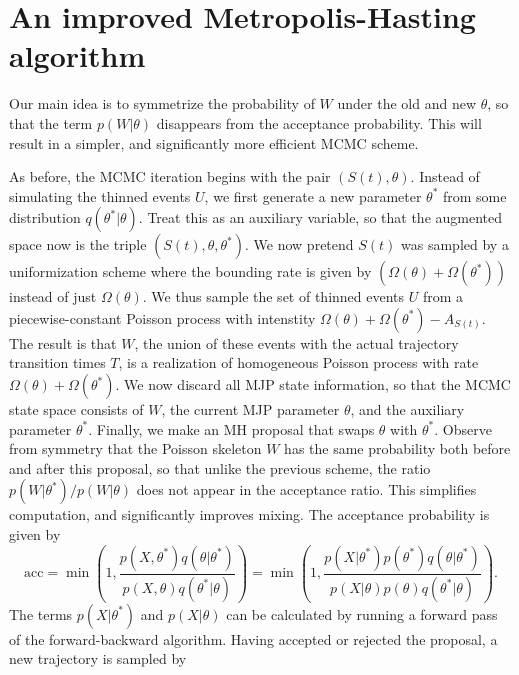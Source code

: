 
\section{An improved Metropolis-Hasting algorithm}

Our main idea is to symmetrize the probability of $W$ under the old and new 
$\theta$, so that the term
$p(W|\theta)$ disappears from the acceptance probability. This will result
in a simpler, and significantly more efficient MCMC scheme.

As before, the MCMC iteration begins with the pair $(S(t), \theta)$. 
Instead of simulating the thinned events $U$, we first generate a new parameter 
$\theta^*$ from some distribution $q(\theta^*|\theta)$. Treat this as an 
auxiliary variable, so that the augmented space now is the triple 
$(S(t), \theta,\theta^*)$. We now pretend $S(t)$ was sampled by a 
uniformization scheme where the bounding rate is given by 
$(\Omega(\theta) + \Omega(\theta^*))$ instead of just $\Omega(\theta)$.
We thus sample the set of thinned events $U$ from a piecewise-constant
Poisson process with intenstity $\Omega(\theta) + \Omega(\theta^*) - 
A_{S(t)}$. The result is that $W$, the union of these events with the actual
trajectory transition times $T$, is a realization of homogeneous Poisson
process with rate $\Omega(\theta) + \Omega(\theta^*)$. We now discard all MJP 
state information, so that the MCMC state space consists of $W$, the current
MJP parameter $\theta$, and the auxiliary parameter $\theta^*$.
Finally, we make an MH proposal that swaps $\theta$ with $\theta^*$. 
Observe from
symmetry that the Poisson skeleton $W$ has the same probability both
before and after this proposal, so that unlike the previous scheme,
the ratio $p(W|\theta^*)/p(W|\theta)$ does not appear in the acceptance 
ratio. This simplifies computation, and significantly improves mixing.
The acceptance probability 
is given by
$$ \text{acc} = 
  \min\left(1, \frac{p(X,\theta^*)q(\theta|\theta^*)}
   {p(X,\theta)q(\theta^*|\theta)}\right) = 
  \min\left(1, \frac{p(X|\theta^*)p(\theta^*)q(\theta|\theta^*)}
   {p(X|\theta)p(\theta)q(\theta^*|\theta)}\right).
   $$
   The terms $p(X|\theta^*)$ and  $p(X|\theta)$ can be calculated by 
   running a forward pass of the forward-backward algorithm. Having
   accepted or rejected the proposal, a new trajectory is sampled by
